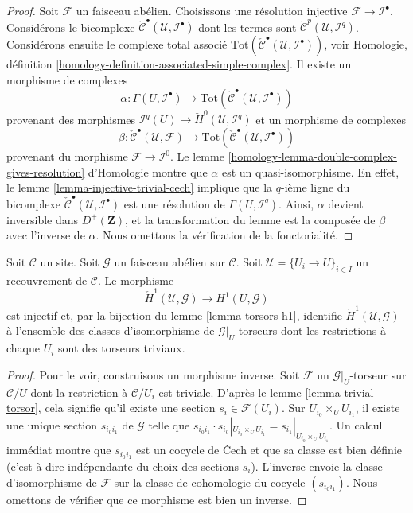 \begin{proof}
Soit $\mathcal{F}$ un faisceau abélien. Choisissons une résolution injective
$\mathcal{F} \to \mathcal{I}^\bullet$. Considérons le bicomplexe
$\check{\mathcal{C}}^\bullet(\mathcal{U}, \mathcal{I}^\bullet)$
dont les termes sont $\check{\mathcal{C}}^p(\mathcal{U}, \mathcal{I}^q)$.
Considérons ensuite le complexe total associé
$\text{Tot}(\check{\mathcal{C}}^\bullet(\mathcal{U}, \mathcal{I}^\bullet))$,
voir Homologie, définition
\ref{homology-definition-associated-simple-complex}. Il existe un morphisme
de complexes
$$
\alpha :
\Gamma(U, \mathcal{I}^\bullet)
\longrightarrow
\text{Tot}(\check{\mathcal{C}}^\bullet(\mathcal{U}, \mathcal{I}^\bullet))
$$
provenant des morphismes
$\mathcal{I}^q(U) \to \check{H}^0(\mathcal{U}, \mathcal{I}^q)$
et un morphisme de complexes
$$
\beta :
\check{\mathcal{C}}^\bullet(\mathcal{U}, \mathcal{F})
\longrightarrow
\text{Tot}(\check{\mathcal{C}}^\bullet(\mathcal{U}, \mathcal{I}^\bullet))
$$
provenant du morphisme $\mathcal{F} \to \mathcal{I}^0$.
Le lemme \ref{homology-lemma-double-complex-gives-resolution} d'Homologie
montre que $\alpha$ est un quasi-isomorphisme.
En effet, le lemme \ref{lemma-injective-trivial-cech} implique que la
$q$-ième ligne du bicomplexe
$\check{\mathcal{C}}^\bullet(\mathcal{U}, \mathcal{I}^\bullet)$ est une
résolution de $\Gamma(U, \mathcal{I}^q)$.
Ainsi, $\alpha$ devient inversible dans $D^{+}(\mathbf{Z})$, et la
transformation du lemme est la composée de $\beta$ avec l'inverse de
$\alpha$. Nous omettons la vérification de la fonctorialité.
\end{proof}

\begin{lemma}
\label{lemma-cech-h1}
Soit $\mathcal{C}$ un site. Soit $\mathcal{G}$ un faisceau abélien sur
$\mathcal{C}$. Soit $\mathcal{U} = \{U_i \to U\}_{i \in I}$ un recouvrement
de $\mathcal{C}$. Le morphisme
$$
\check{H}^1(\mathcal{U}, \mathcal{G})
\longrightarrow
H^1(U, \mathcal{G})
$$
est injectif et, par la bijection du lemme \ref{lemma-torsors-h1}, identifie
$\check{H}^1(\mathcal{U}, \mathcal{G})$ à l'ensemble des classes
d'isomorphisme de $\mathcal{G}|_U$-torseurs dont les restrictions à chaque
$U_i$ sont des torseurs triviaux.
\end{lemma}

\begin{proof}
Pour le voir, construisons un morphisme inverse. Soit $\mathcal{F}$ un
$\mathcal{G}|_U$-torseur sur $\mathcal{C}/U$ dont la restriction à
$\mathcal{C}/U_i$ est triviale. D'après le lemme
\ref{lemma-trivial-torsor}, cela signifie qu'il existe une section
$s_i \in \mathcal{F}(U_i)$. Sur $U_{i_0} \times_U U_{i_1}$, il existe une
unique section $s_{i_0i_1}$ de $\mathcal{G}$ telle que
$s_{i_0i_1} \cdot s_{i_0}|_{U_{i_0} \times_U U_{i_1}} =
s_{i_1}|_{U_{i_0} \times_U U_{i_1}}$. Un calcul immédiat montre que
$s_{i_0i_1}$ est un cocycle de {\v C}ech et que sa classe est bien définie
(c'est-à-dire indépendante du choix des sections $s_i$).
L'inverse envoie la classe d'isomorphisme de $\mathcal{F}$ sur la classe de
cohomologie du cocycle $(s_{i_0i_1})$. Nous omettons de vérifier que ce
morphisme est bien un inverse.
\end{proof}

